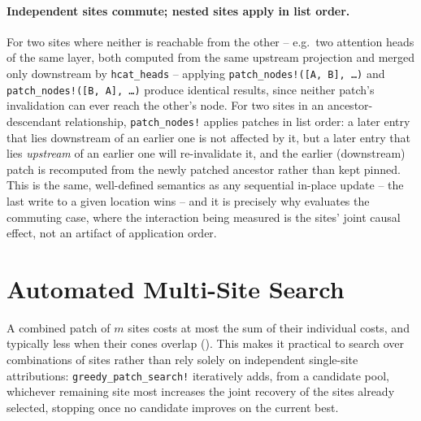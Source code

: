 \documentclass{article}
\begin{document}
\paragraph{Independent sites commute; nested sites apply in list order.} For two sites where
neither is reachable from the other -- e.g.\ two attention heads of the same layer, both computed
from the same upstream projection and merged only downstream by \texttt{hcat\_heads} -- applying
\texttt{patch\_nodes!([A, B], \ldots)} and \texttt{patch\_nodes!([B, A], \ldots)} produce
identical results, since neither patch's invalidation can ever reach the other's node. For two
sites in an ancestor-descendant relationship, \texttt{patch\_nodes!} applies patches in list
order: a later entry that lies downstream of an earlier one is not affected by it, but a later
entry that lies \emph{upstream} of an earlier one will re-invalidate it, and the earlier
(downstream) patch is recomputed from the newly patched ancestor rather than kept pinned. This is
the same, well-defined semantics as any sequential in-place update -- the last write to a given
location wins -- and it is precisely why  evaluates the commuting case, where
the interaction being measured is the sites' joint causal effect, not an artifact of application
order.

\section{Automated Multi-Site Search}
\label{sec:search}

A combined patch of $m$ sites costs at most the sum of their individual costs, and typically less
when their cones overlap (). This makes it practical to search over
combinations of sites rather than rely solely on independent single-site attributions:
\texttt{greedy\_patch\_search!} iteratively adds, from a candidate pool, whichever remaining site
most increases the joint recovery of the sites already selected, stopping once no candidate
improves on the current best.
\end{document}
